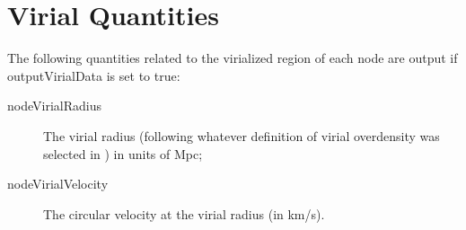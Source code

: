 \section{Virial Quantities}

The following quantities related to the virialized region of each node are output if {\normalfont \ttfamily outputVirialData} is set to true:
\begin{description}
 \item [{\normalfont \ttfamily nodeVirialRadius}] The virial radius (following whatever definition of virial overdensity was selected in \glc) in units of Mpc;
 \item [{\normalfont \ttfamily nodeVirialVelocity}] The circular velocity at the virial radius (in km/s).
\end{description}
